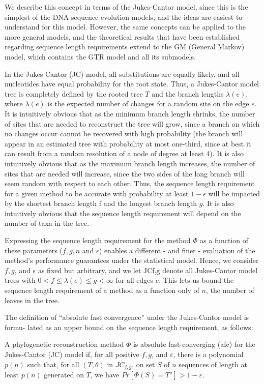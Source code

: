 We describe this concept in terms of the Jukes-Cantor model, 
since this is the simplest of the DNA sequence evolution models, 
and the ideas are easiest to understand for this model. However, 
the same concepts can be applied to the more general models, and 
the theoretical results that have been established regarding sequence 
length requirements extend to the GM (General Markov) model, which 
contains the GTR model and all its submodels.

In the Jukes-Cantor (JC) model, all substitutions are equally likely, 
and all nucleotides have equal probability for the root state. 
Thus, a Jukes-Cantor model tree is completely defined by the rooted 
tree $T$ and the branch lengths $\lambda(e)$, where $\lambda(e)$ is 
the expected number of changes for a random site on the edge $e$. 
It is intuitively obvious that as the minimum branch length 
shrinks, the number of sites that are needed to reconstruct the 
tree will grow, since a branch on which no changes occur 
cannot be recovered with high probability (the branch will appear 
in an estimated tree with probability at most one-third, 
since at best it can result from a random resolution of a 
node of degree at least 4). It is also intuitively obvious 
that as the maximum branch length increases, the number of 
sites that are needed will increase, since the two sides 
of the long branch will seem random with respect to each other. 
Thus, the sequence length requirement for a given method to be 
accurate with probability at least $1 - \epsilon$ will be 
impacted by the shortest branch length f and the longest 
branch length $g$. It is also intuitively obvious that the 
sequence length requirement will depend on the number of 
taxa in the tree.  

Expressing the sequence length requirement for the 
method $\Phi$ as a function of these parameters ($f,g,n$ and $\epsilon$) 
enables a different - and finer - evaluation of the method's performance 
guarantees under the statistical model. Hence, we consider $f,g$, and $\epsilon$ 
as fixed but arbitrary, and we let JCf,g denote all Jukes-Cantor model 
trees with $0 < f \leq \lambda(e) \leq g < \infty$ for all edges $e$. 
This lets us bound the sequence length requirement of a method as a 
function only of $n$, the number of leaves in the tree. 

The definition of ``absolute fast convergence'' under the Jukes-Cantor 
model is formu- lated as an upper bound on the sequence length requirement, 
as follows:

\begin{defn}
A phylogenetic reconstruction method $\Phi$ is absolute fast-converging (afc) 
for the Jukes-Cantor (JC) model if, for all positive $f,g$, and $\varepsilon$, 
there is a polynomial $p(n)$ such that, for all $(T,\theta)$ in $JC_{f,g}$, 
on set $S$ of $n$ sequences of length at least $p(n)$ generated on $T$, 
we have $Pr[\Phi(S) = T^u] > 1 - \varepsilon$.
\end{defn}

